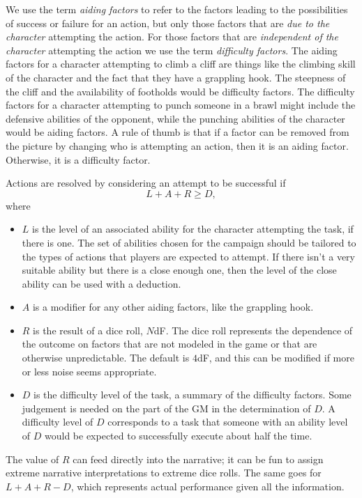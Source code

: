 We use the term \emph{aiding factors} to refer to the factors leading to the possibilities of success or failure for an action,
but only those factors that are \emph{due to the character} attempting the action.
For those factors that are \emph{independent of the character} attempting the action we use the term \emph{difficulty factors}.
The aiding factors for a character attempting to climb a cliff are things like the climbing skill of the character and the fact that they have a grappling hook.
The steepness of the cliff and the availability of footholds would be difficulty factors.
The difficulty factors for a character attempting to punch someone in a brawl might include the defensive abilities of the opponent,
while the punching abilities of the character would be aiding factors.
A rule of thumb is that if a factor can be removed from the picture by changing who is attempting an action, then it is an aiding factor.
Otherwise, it is a difficulty factor.

Actions are resolved by considering an attempt to be successful if
$$L + A + R \geq D,$$
where
\begin{itemize}
\item
$L$ is the level of an associated ability for the character attempting the task, if there is one.
The set of abilities chosen for the campaign should be tailored to the types of actions that players are expected to attempt.
If there isn’t a very suitable ability but there is a close enough one, then the level of the close ability can be used with a deduction. 
\item
$A$ is a modifier for any other aiding factors, like the grappling hook.
\item
$R$ is the result of a dice roll, $N$dF.
The dice roll represents the dependence of the outcome on factors that are not modeled in the game or that are otherwise unpredictable.
The default is $4$dF, and this can be modified if more or less noise seems appropriate.
\item
$D$ is the difficulty level of the task, a summary of the difficulty factors.
Some judgement is needed on the part of the GM in the determination of $D$.
A difficulty level of $D$ corresponds to a task that someone with an ability level of $D$ would be expected to successfully execute about half the time.
\end{itemize}

The value of $R$ can feed directly into the narrative; it can be fun to assign extreme narrative interpretations to extreme dice rolls.
The same goes for $L + A + R - D$, which represents actual performance given all the information.

